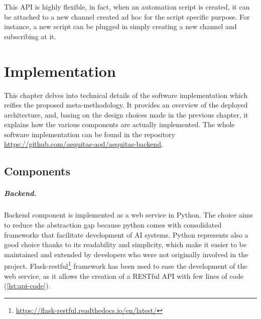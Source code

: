 \documentclass[12pt,a4paper,openright,twoside]{book}
\begin{document}
This API is highly flexible, in fact, when an automation script is created, it can be attached to a new channel created ad hoc for the script specific purpose.
%
For instance, a new script can be plugged in simply  creating a new channel and subscribing at it.




\chapter{Implementation}%
\label{chap:implementation}

This chapter delves into technical details of the software implementation which reifies the proposed meta-methodology.
%
It provides an overview of the deployed architecture, and, basing on the design choices made in the previous chapter, it explains how the various components are actually implemented.
%
The whole software implementation can be found in the repository \href{https://github.com/aequitas-aod/aequitas-backend}{https://github.com/aequitas-aod/aequitas-backend}.


\section{Components}


\paragraph{Backend.}


Backend component is implemented as a web service in Python. The choice aims to reduce the abstraction gap because python comes with consolidated frameworks that facilitate development of \ac{AI} systems.
%
Python represents also a good choice thanks to its readability and simplicity, which make it easier to be maintained and extended by developers who were not originally involved in the project.
%
Flask-restful\footnote{\href{https://flask-restful.readthedocs.io/en/latest/}{https://flask-restful.readthedocs.io/en/latest/}} framework has been used to ease the development of the web service, as it allows the creation of a RESTful \ac{API} with few lines of code (\cref{lst:api-code}).



\end{document}
